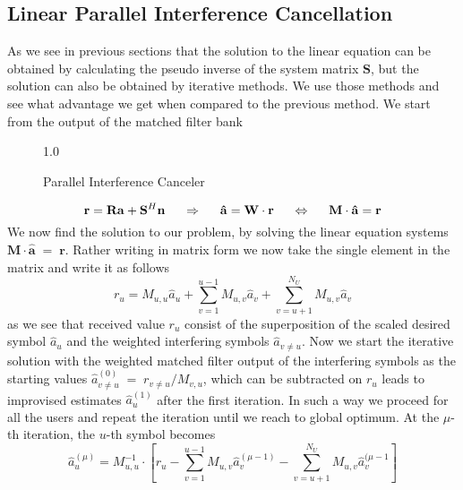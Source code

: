 \subsection{Linear Parallel Interference Cancellation}
As we see in previous sections that the solution to the linear equation can be obtained by calculating the pseudo inverse of the system matrix $\mathrm{\mathbf{S}}$, but the solution can also be obtained by iterative methods. We use those methods and see what advantage we get when compared to the previous method. We start from the output of the matched filter bank
\begin{figure}[htb]
\centerline{  {1.0} }
\caption{Parallel Interference Canceler}
\end{figure}
\begin{equation}
\mathrm{\mathbf{r}}=\mathrm{\mathbf{R}}\mathrm{\mathbf{a}}+\mathrm{\mathbf{S}}^H\mathrm{\mathbf{n}}\hspace{5mm}\Rightarrow\hspace{5mm}\mathrm{\mathbf{\hat{a}}}=\mathrm{\mathbf{W}}\cdot\mathrm{\mathbf{r}}\hspace{5mm}\Leftrightarrow\hspace{5mm}\mathrm{\mathbf{M}}\cdot\mathrm{\mathbf{\hat{a}}}=\mathrm{\mathbf{r}}
\end{equation}
We now find the solution to our problem, by solving the linear equation systems $\mathrm{\mathbf{M}}\cdot\mathrm{\mathbf{\hat{a}}}\;=\;\mathrm{\mathbf{r}}$. Rather writing in matrix form we now take the single element in the matrix and write it as follows
\begin{equation}
r_u=M_{u,u}\hat{a}_u+\sum\limits_{v=1}^{u-1}M_{u,v}\hat{a}_v+\sum\limits_{v=u+1}^{N_U}M_{u,v}\hat{a}_v
\end{equation}
as we see that received value $r_u$ consist of the superposition of the scaled desired symbol $\hat{a}_u$ and the weighted interfering symbols $\hat{a}_{v\ne u}$. Now we start the iterative solution with the weighted matched filter output of the interfering symbols as the starting values $\hat{a}^{(0)}_{v\ne u}\;=\;r_{v\ne u}/M_{v,u}$, which can be subtracted on $r_u$ leads to improvised estimates $\hat{a}_u^{(1)}$ after the first iteration. In such a way we proceed for all the users and repeat the iteration until we reach to global optimum. At the $\mu$-th iteration, the $u$-th symbol becomes
\begin{equation}
\hat{a}_u^{(\mu)}=M_{u,u}^{-1}\cdot\left[r_u-\sum\limits_{v=1}^{u-1}M_{u,v}\hat{a}_v^{(\mu-1)}-\sum\limits_{v=u+1}^{N_U}M_{u,v}\hat{a}_v^{(\mu-1}\right]
\end{equation}
